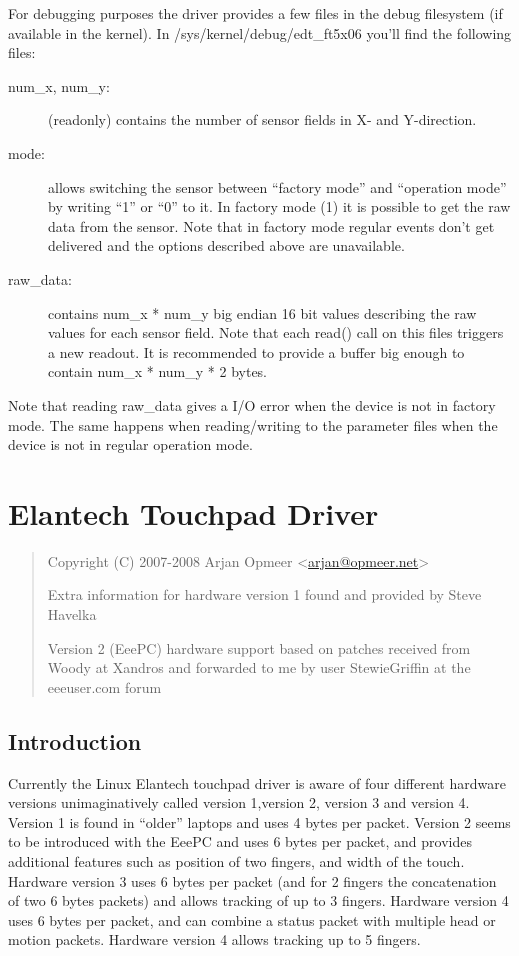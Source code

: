 \documentclass[a4paper,8pt,english]{sphinxmanual}
\begin{document}
For debugging purposes the driver provides a few files in the debug
filesystem (if available in the kernel). In /sys/kernel/debug/edt\_ft5x06
you'll find the following files:
\begin{description}
\item[{num\_x, num\_y:}] \leavevmode
(readonly) contains the number of sensor fields in X- and
Y-direction.

\item[{mode:}] \leavevmode
allows switching the sensor between ``factory mode'' and ``operation
mode'' by writing ``1'' or ``0'' to it. In factory mode (1) it is
possible to get the raw data from the sensor. Note that in factory
mode regular events don't get delivered and the options described
above are unavailable.

\item[{raw\_data:}] \leavevmode
contains num\_x * num\_y big endian 16 bit values describing the raw
values for each sensor field. Note that each read() call on this
files triggers a new readout. It is recommended to provide a buffer
big enough to contain num\_x * num\_y * 2 bytes.

\end{description}

Note that reading raw\_data gives a I/O error when the device is not in factory
mode. The same happens when reading/writing to the parameter files when the
device is not in regular operation mode.


\section{Elantech Touchpad Driver}
\label{input/devices/elantech::doc}\label{input/devices/elantech:elantech-touchpad-driver}\begin{quote}

Copyright (C) 2007-2008 Arjan Opmeer \textless{}\href{mailto:arjan@opmeer.net}{arjan@opmeer.net}\textgreater{}

Extra information for hardware version 1 found and
provided by Steve Havelka

Version 2 (EeePC) hardware support based on patches
received from Woody at Xandros and forwarded to me
by user StewieGriffin at the eeeuser.com forum
\end{quote}


\subsection{Introduction}
\label{input/devices/elantech:introduction}
Currently the Linux Elantech touchpad driver is aware of four different
hardware versions unimaginatively called version 1,version 2, version 3
and version 4. Version 1 is found in ``older'' laptops and uses 4 bytes per
packet. Version 2 seems to be introduced with the EeePC and uses 6 bytes
per packet, and provides additional features such as position of two fingers,
and width of the touch.  Hardware version 3 uses 6 bytes per packet (and
for 2 fingers the concatenation of two 6 bytes packets) and allows tracking
of up to 3 fingers. Hardware version 4 uses 6 bytes per packet, and can
combine a status packet with multiple head or motion packets. Hardware version
4 allows tracking up to 5 fingers.
\end{document}
